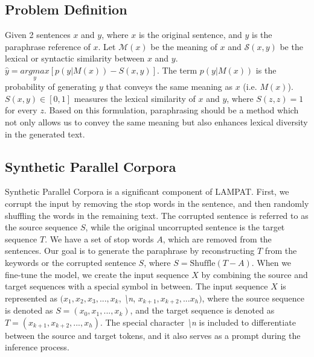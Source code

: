 \documentclass[letterpaper]{article} %
\begin{document}
\subsection{Problem Definition}
Given 2 sentences $x$ and $y$, where $x$ is the original sentence, and $y$ is the paraphrase reference of $x$. Let $\mathcal{M}(x)$ be the meaning of $x$ and $\mathcal{S}(x,y)$ be the lexical or syntactic similarity between $x$ and $y$. $\hat{y} = \underset{y}{argmax}[p(y|M(x)) - S(x,y)]$. The term $p(y|M(x))$ is the probability of generating $y$ that conveys the same meaning as $x$ (i.e. $M(x)$). $S(x,y) \in [0,1]$ measures the lexical similarity of $x$ and $y$, where $S(z,z)= 1$ for every $z$. Based on this formulation, paraphrasing should be a method which not only allows us to convey the same meaning but also enhances lexical diversity in the generated text. %

\subsection{Synthetic Parallel Corpora}
Synthetic Parallel Corpora is a significant component of LAMPAT. First, we corrupt the input by removing the stop words in the sentence, and then randomly shuffling the words in the remaining text. The corrupted sentence is referred to as the source sequence $S$, while the original uncorrupted sentence is the target sequence $T$. We have a set of stop words $A$, which are removed from the sentences. Our goal is to generate the paraphrase by reconstructing $T$ from the keywords or the corrupted sentence $S$, where $S = \text{Shuffle} (T - A)$. When we fine-tune the model, we create the input sequence $X$ by combining the source and target sequences with a special symbol in between. The input sequence $X$ is represented as $(x_1, x_2, x_3, ..., x_k$, \textit{\textbackslash n}, $x_{k+1}, x_{k+2}, ...x_h)$, where the source sequence is denoted as $S = (x_0, x_1, ..., x_k)$, and the target sequence is denoted as $T = (x_{k+1}, x_{k+2}, ..., x_h)$. The special character \textit{\textbackslash n} is included to differentiate between the source and target tokens, and it also serves as a prompt during the inference process.
\end{document}
